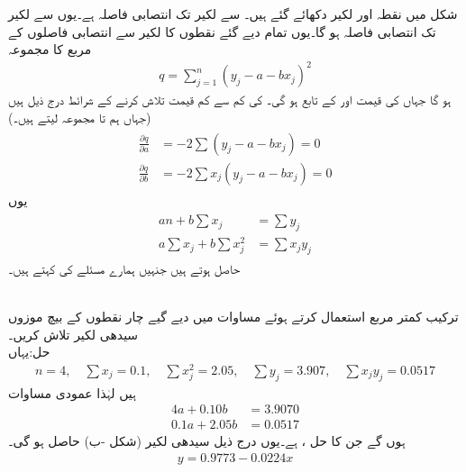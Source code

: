 شکل  میں نقطہ  اور لکیر  دکھائے گئے ہیں۔ سے لکیر تک انتصابی فاصلہ  ہے۔یوں  سے لکیر تک انتصابی فاصلہ  ہو گا۔یوں تمام دیے گئے نقطوں کا لکیر سے انتصابی فاصلوں کے مربع کا مجموعہ
\begin{align*}
q=\sum_{j=1}^{n} (y_j-a-bx_j)^2
\end{align*}
ہو گا جہاں  کی قیمت  اور  کے تابع ہو گی۔ کی کم سے کم قیمت تلاش کرنے کے شرائط درج ذیل ہیں (جہاں ہم  تا  مجموعہ لیتے ہیں۔)
\begin{gather}
\begin{aligned}\label{مساوات_خطی_اعدادی_کمتر_مربع_شرائط_ب}
\frac{\partial q}{\partial a}&=-2\sum(y_j-a-bx_j)=0\\[0.5ex]
\frac{\partial q}{\partial b}&=-2\sum x_j(y_j-a-bx_j)=0
\end{aligned} 
\end{gather}
یوں 
\begin{gather}
\begin{aligned}\label{مساوات_خطی_اعدادی_کمتر_مربع_شرائط_پ}
an+b\sum x_j&=\sum y_j\\[0.5ex]
a\sum x_j+b\sum x_j^2&=\sum x_jy_j
\end{aligned}
\end{gather}
حاصل ہوتے ہیں جنہیں ہمارے مسئلے کی  کہتے ہیں۔

\quad {}\\
ترکیب کمتر مربع استعمال کرتے ہوئے  مساوات  میں دیے گیے چار نقطوں کے بیچ موزوں سیدھی لکیر تلاش کریں۔\\
حل:\quad یہاں
\begin{align*}
n=4,\quad \sum x_j=0.1,\quad \sum x_j^2=2.05,\quad \sum y_j=3.907, \quad \sum x_jy_j=0.0517
\end{align*}  
ہیں لہٰذا عمودی مساوات
\begin{align*}
4a+0.10b&=3.9070\\
0.1a+2.05b&=0.0517
\end{align*}
ہوں گے جن کا حل ،  ہے۔یوں درج ذیل سیدھی لکیر (شکل -ب) حاصل ہو گی۔
\begin{align*}
y=0.9773-0.0224x
\end{align*}

